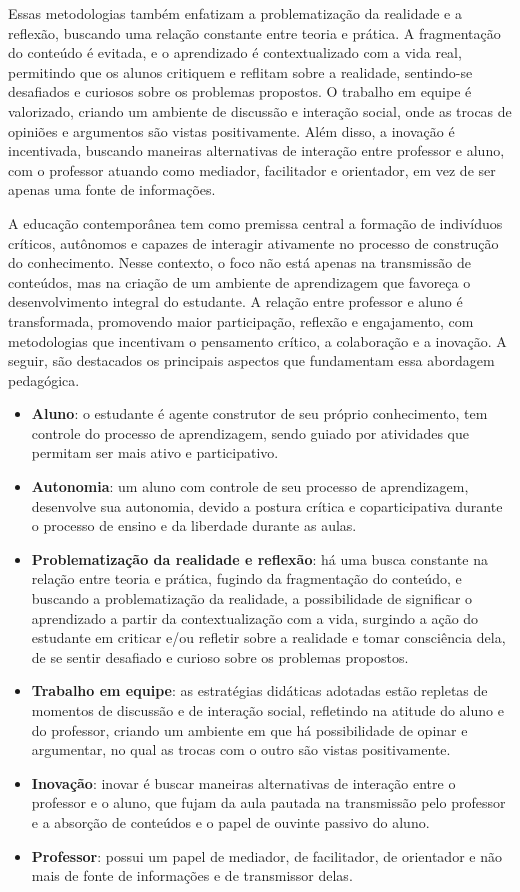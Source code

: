 Essas metodologias também enfatizam a problematização da realidade e a reflexão, buscando uma relação constante entre teoria e prática. A fragmentação do conteúdo é evitada, e o aprendizado é contextualizado com a vida real, permitindo que os alunos critiquem e reflitam sobre a realidade, sentindo-se desafiados e curiosos sobre os problemas propostos. O trabalho em equipe é valorizado, criando um ambiente de discussão e interação social, onde as trocas de opiniões e argumentos são vistas positivamente. Além disso, a inovação é incentivada, buscando maneiras alternativas de interação entre professor e aluno, com o professor atuando como mediador, facilitador e orientador, em vez de ser apenas uma fonte de informações.

A educação contemporânea tem como premissa central a formação de indivíduos críticos, autônomos e capazes de interagir ativamente no processo de construção do conhecimento. Nesse contexto, o foco não está apenas na transmissão de conteúdos, mas na criação de um ambiente de aprendizagem que favoreça o desenvolvimento integral do estudante. A relação entre professor e aluno é transformada, promovendo maior participação, reflexão e engajamento, com metodologias que incentivam o pensamento crítico, a colaboração e a inovação. A seguir, são destacados os principais aspectos que fundamentam essa abordagem pedagógica.

\begin{itemize}
    \item \textbf{Aluno}: o estudante é agente construtor de seu próprio conhecimento, tem controle do processo de aprendizagem, sendo guiado por atividades que permitam ser mais ativo e participativo.
    \item \textbf{Autonomia}: um aluno com controle de seu processo de aprendizagem, desenvolve sua autonomia, devido a postura crítica e coparticipativa durante o processo de ensino e da liberdade durante as aulas.
    \item \textbf{Problematização da realidade e reflexão}: há uma busca constante na relação entre teoria e prática, fugindo da fragmentação do conteúdo, e buscando a problematização da realidade, a possibilidade de significar o aprendizado a partir da contextualização com a vida, surgindo a ação do estudante em criticar e/ou refletir sobre a realidade e tomar consciência dela, de se sentir desafiado e curioso sobre os problemas propostos.
    \item \textbf{Trabalho em equipe}: as estratégias didáticas adotadas estão repletas de momentos de discussão e de interação social, refletindo na atitude do aluno e do professor, criando um ambiente em que há possibilidade de opinar e argumentar, no qual as trocas com o outro são vistas positivamente.
    \item \textbf{Inovação}: inovar é buscar maneiras alternativas de interação entre o professor e o aluno, que fujam da aula pautada na transmissão pelo professor e a absorção de conteúdos e o papel de ouvinte passivo do aluno.
    \item \textbf{Professor}: possui um papel de mediador, de facilitador, de orientador e não mais de fonte de informações e de transmissor delas.
\end{itemize}

